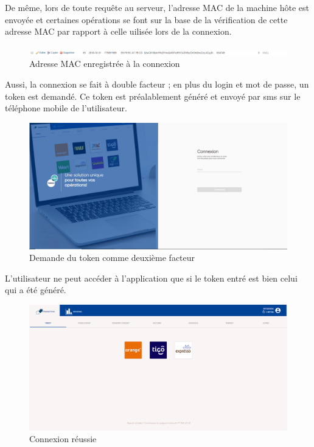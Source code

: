 De même, lors de toute requête au serveur, l'adresse MAC de la machine hôte est envoyée et certaines opérations se font sur la base de la vérification de cette adresse MAC par rapport à celle uilisée lors de la connexion.
\begin{figure}[H]
	\centering
	\begin{minipage}{12cm}
		\centering
		\includegraphics[width=1\textwidth]{fig/conn-mac.PNG}
	\end{minipage}
	\caption{Adresse MAC enregistrée à la connexion}
	\label{fig:sdedffds}
\end{figure}
Aussi, la connexion se fait à double facteur ; en plus du login et mot de passe,  un token est demandé. Ce token est préalablement généré et envoyé par sms sur le téléphone mobile de l'utilisateur.
\begin{figure}[H]
	\centering
	\begin{minipage}{12cm}
		\centering
		\includegraphics[width=1\textwidth]{fig/token.PNG}
	\end{minipage}
	\caption{Demande du token comme deuxième facteur}
	\label{fig:sdedffds}
\end{figure}
L'utilisateur ne peut accéder à l'application que si le token entré est bien celui qui a été généré.
\begin{figure}[H]
	\centering
	\begin{minipage}{12cm}
		\centering
		\includegraphics[width=1\textwidth]{fig/conn-ok.PNG}
	\end{minipage}
	\caption{Connexion réussie}
	\label{fig:sdedffds}
\end{figure}
